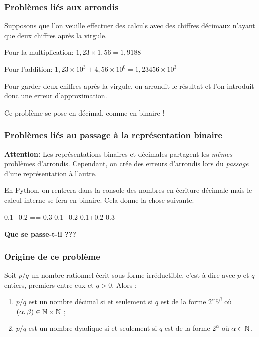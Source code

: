 \subsubsection{Problèmes liés aux arrondis}
Supposons que l'on veuille effectuer des calculs avec des chiffres décimaux n'ayant que deux chiffres après la virgule.
\begin{exemple}
Pour la multiplication:
$1,23\times 1,56 = 1,9188$
\end{exemple}
\begin{exemple}
Pour l'addition:
$1,23\times 10^{3} + 4,56\times 10^{0} = 1,23456\times 10^{3}$
\end{exemple}
Pour garder deux chiffres après la virgule, on arrondit le résultat et l'on introduit donc une erreur d'approximation.

Ce problème se pose en décimal, comme en binaire !

\subsubsection{Problèmes liés au passage à la représentation binaire}

\textbf{Attention:}
Les représentations binaires et décimales partagent les \emph{mêmes} problèmes d'arrondis. 
Cependant, on crée des erreurs d'arrondis lors du \emph{passage} d'une représentation à l'autre.
\begin{exemple}
En Python, on rentrera dans la console des nombres en écriture décimale mais le calcul interne se fera en binaire. Cela donne la chose suivante.
\begin{pyconsole}
0.1+0.2 == 0.3
0.1+0.2
0.1+0.2-0.3
\end{pyconsole}
\end{exemple}


\begin{center}
\textbf{Que se passe-t-il ???}
\end{center}

\subsubsection{Origine de ce problème}

\begin{theoremeT}
Soit $p/q$ un nombre rationnel écrit sous forme irréductible, c'est-à-dire avec $p$
et $q$ entiers, premiers entre eux et $q>0$. Alors :
\begin{enumerate}
\item $p/q$ est un nombre décimal si et seulement
  si $q$ est de la forme $2^{\alpha}5^{\beta}$ où $(\alpha,\beta)\in
  \mathbb{N}\times \mathbb{N}$ ;
\item $p/q$ est un nombre dyadique si et seulement
  si $q$ est de la forme $2^{\alpha}$ où $\alpha\in \mathbb{N}$.
\end{enumerate}
\end{theoremeT}

